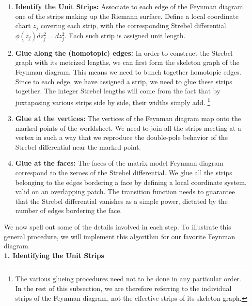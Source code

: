 \documentclass[english]{article}
\renewcommand{\>}{\rangle}
\newcommand{\<}{\langle}
\renewcommand{\(}{\left(}
\renewcommand{\)}{\right)}
\begin{document}
\begin{enumerate}
    \item \textbf{Identify the Unit Strips:} Associate to each edge of the Feynman diagram one of the strips making up the Riemann surface. Define a local coordinate chart $z_j$ covering each strip, with the corresponding Strebel differential $\phi(z_j) dz_{j}^2 = dz_{j}^2$. Each such strip is assigned unit length.
    \item \textbf{Glue along the (homotopic) edges:} In order to construct the Strebel graph with its metrized lengths, we can first form the skeleton graph of the Feynman diagram. This means we need to bunch together homotopic edges. Since to each edge, we have assigned a strip, we need to glue these strips together. The integer Strebel lengths will come from the fact that by juxtaposing various strips side by side, their widths simply add. \footnote{The various glueing procedures need not to be done in any particular order. In the rest of this subsection, we are therefore referring to the individual strips of the Feynman diagram, not the effective strips of its skeleton graph.}  
    \item \textbf{Glue at the vertices:} The vertices of the Feynman diagram map onto the marked points of the worldsheet. We need to join all the strips meeting at a vertex in such a way that we reproduce the double-pole behavior of the Strebel differential near the marked point. 
    \item \textbf{Glue at the faces:} The faces of the matrix model Feynman diagram correspond to the zeroes of the Strebel differential. We glue all the strips belonging to the edges bordering a face by defining a local coordinate system, valid on an overlapping patch. The transition function needs to guarantee that the Strebel differential vanishes as a simple power, dictated by the number of edges bordering the face.  
\end{enumerate}


We now spell out some of the details involved in each step. To illustrate this general procedure, we will implement this algorithm for our favorite Feynman diagram.
\\

\noindent\textbf{1. Identifying the Unit Strips}
\end{document}

